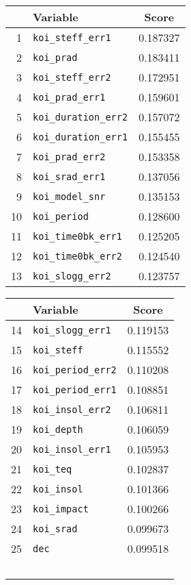 \begin{tabular}{rlc}
\toprule
                   &  Variable &     Score \\
\midrule
1  &    \texttt{koi\_steff\_err1} &  0.187327 \\
2  &           \texttt{koi\_prad} &  0.183411 \\
3  &    \texttt{koi\_steff\_err2} &  0.172951 \\
4  &     \texttt{koi\_prad\_err1} &  0.159601 \\
5  & \texttt{koi\_duration\_err2} &  0.157072 \\
6  & \texttt{koi\_duration\_err1} &  0.155455 \\
7  &     \texttt{koi\_prad\_err2} &  0.153358 \\
8  &     \texttt{koi\_srad\_err1} &  0.137056 \\
9  &     \texttt{koi\_model\_snr} &  0.135153 \\
10 &         \texttt{koi\_period} &  0.128600 \\
11 &  \texttt{koi\_time0bk\_err1} &  0.125205 \\
12 &  \texttt{koi\_time0bk\_err2} &  0.124540 \\
13 &    \texttt{koi\_slogg\_err2} &  0.123757 \\
\bottomrule
\end{tabular}
\quad
\begin{tabular}{rlc}
\toprule
                   &  Variable &     Score \\
\midrule
14 &    \texttt{koi\_slogg\_err1} &  0.119153 \\
15 &          \texttt{koi\_steff} &  0.115552 \\
16 &   \texttt{koi\_period\_err2} &  0.110208 \\
17 &   \texttt{koi\_period\_err1} &  0.108851 \\
18 &    \texttt{koi\_insol\_err2} &  0.106811 \\
19 &          \texttt{koi\_depth} &  0.106059 \\
20 &    \texttt{koi\_insol\_err1} &  0.105953 \\
21 &            \texttt{koi\_teq} &  0.102837 \\
22 &          \texttt{koi\_insol} &  0.101366 \\
23 &         \texttt{koi\_impact} &  0.100266 \\
24 &           \texttt{koi\_srad} &  0.099673 \\
25 &                 \texttt{dec} &  0.099518 \\
\, & & \\
\bottomrule
\end{tabular}